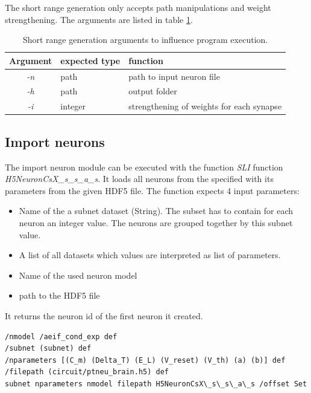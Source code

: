 The short range generation only accepts path manipulations and weight strengthening.
The arguments are listed in table \ref{tab:shortrangeargs}.
\begin{table}[ht!]
\begin{centering}
    \begin{tabular}{ | c | l | p{7cm} |}
    \hline
    Argument & expected type & function \\ \hline \hline
    \emph{-n} & path & path to input neuron file \\ \hline
    \emph{-h} & path &  output folder\\ \hline
    \emph{-i} & integer & strengthening of weights for each synapse \\ \hline
    \end{tabular}
    \caption{Short range generation arguments to influence program execution.}
    \label{tab:shortrangeargs}
\end{centering}
\end{table}

\subsection{Import neurons}
The import neuron module can be executed with the function \emph{SLI} function  \emph{H5NeuronCsX\_s\_s\_a\_s}. It loads all neurons from the specified with its parameters
from the given HDF5 file. The function expects 4 input parameters:
\begin{itemize}
      \item Name of the a subnet dataset (String).
The subset has to contain for each neuron an integer value.
The neurons are grouped together by this subnet value.
      \item A list of all datasets which values are interpreted as list of parameters.
      \item Name of the used neuron model
      \item path to the HDF5 file 
\end{itemize}
It returns the neuron id of the first neuron it created.
\begin{lstlisting}[label=sliNeurons,caption=Calling the neuron import module via H5NeuronCsX\_s\_s\_a\_s SLI command ]
/nmodel /aeif_cond_exp def
/subnet (subnet) def
/nparameters [(C_m) (Delta_T) (E_L) (V_reset) (V_th) (a) (b)] def
/filepath (circuit/ptneu_brain.h5) def
subnet nparameters nmodel filepath H5NeuronCsX\_s\_s\_a\_s /offset Set
\end{lstlisting}

